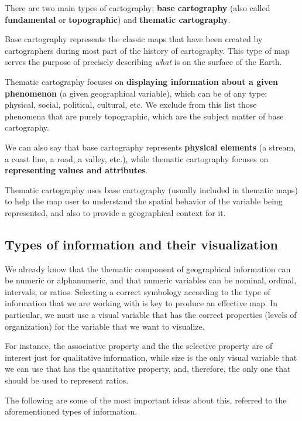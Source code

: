 There are two main types of cartography: \textbf{base cartography} (also called \textbf{fundamental} or \textbf{topographic}) and \textbf{thematic cartography}.

Base cartography represents the classic maps that have been created by cartographers during most part of the history of cartography. This type of map serves the purpose of precisely describing \emph{what} is on the surface of the Earth.

Thematic cartography focuses on \textbf{displaying information about a given phenomenon} (a given geographical variable), which can be of any type: physical, social, political, cultural, etc. We exclude from this list those phenomena that are purely topographic, which are the subject matter of base cartography.

We can also say that base cartography represents \textbf{physical elements} (a stream, a coast line, a road, a valley, etc.), while thematic cartography focuses on \textbf{representing values and attributes}.

Thematic cartography uses base cartography (usually included in thematic maps) to help the map user to understand the spatial behavior of the variable being represented, and also to provide a geographical context for it.


\subsection{Types of information and their visualization}

We already know that the thematic component of geographical information can be numeric or alphanumeric, and that numeric variables can be nominal, ordinal, intervals, or ratios. Selecting a correct symbology according to the type of information that we are working with is key to produce an effective map. In particular, we must use a visual variable that has the correct properties (levels of organization) for the variable that we want to visualize.

For instance, the associative property and the the selective property are of interest just for qualitative information, while size is the only visual variable that we can use that has the quantitative property, and, therefore, the only one that should be used to represent ratios.

The following are some of the most important ideas about this, referred to the aforementioned types of information.


